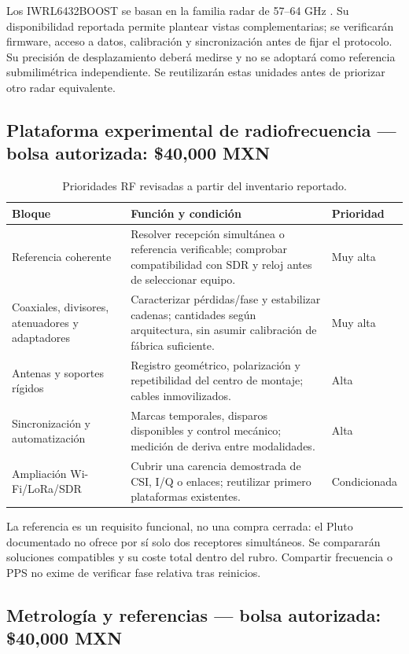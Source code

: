 Los IWRL6432BOOST se basan en la familia radar de 57--64 GHz
\citep{TIIWRL6432BOOST}. Su disponibilidad reportada permite plantear vistas complementarias;
se verificarán firmware, acceso a datos, calibración y sincronización antes de fijar
el protocolo. Su precisión de desplazamiento deberá medirse y no se adoptará como
referencia submilimétrica independiente. Se reutilizarán estas unidades antes de
priorizar otro radar equivalente.

\subsection{Plataforma experimental de radiofrecuencia --- bolsa autorizada: \$40,000 MXN}

\begin{table}[htbp]
\centering\small
\caption{Prioridades RF revisadas a partir del inventario reportado.}
\label{tab:rf_procurement}
\begin{tabularx}{\textwidth}{P{3.4cm}L P{2.9cm}}
\toprule
Bloque & Función y condición & Prioridad\\
\midrule
Referencia coherente & Resolver recepción simultánea o referencia verificable; comprobar
compatibilidad con SDR y reloj antes de seleccionar equipo. & Muy alta\\
Coaxiales, divisores, atenuadores y adaptadores & Caracterizar pérdidas/fase y estabilizar
cadenas; cantidades según arquitectura, sin asumir calibración de fábrica suficiente. & Muy alta\\
Antenas y soportes rígidos & Registro geométrico, polarización y repetibilidad del centro
de montaje; cables inmovilizados. & Alta\\
Sincronización y automatización & Marcas temporales, disparos disponibles y control
mecánico; medición de deriva entre modalidades. & Alta\\
Ampliación Wi-Fi/LoRa/SDR & Cubrir una carencia demostrada de CSI, I/Q o enlaces;
reutilizar primero plataformas existentes. & Condicionada\\
\bottomrule
\end{tabularx}
\end{table}

La referencia es un requisito funcional, no una compra cerrada: el Pluto documentado
no ofrece por sí solo dos receptores simultáneos. Se compararán soluciones compatibles
y su coste total dentro del rubro. Compartir frecuencia o PPS no exime de verificar
fase relativa tras reinicios.

\subsection{Metrología y referencias --- bolsa autorizada: \$40,000 MXN}

